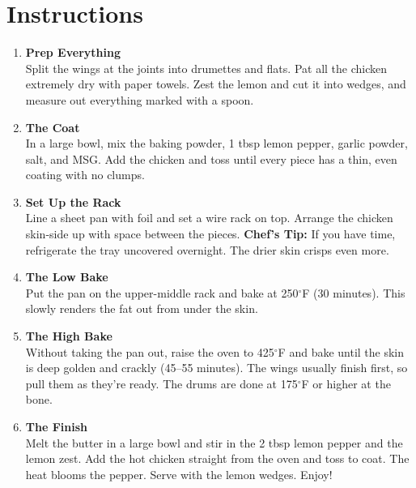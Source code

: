 \newpage
{}
\section*{Instructions}

\begin{enumerate}

      \item \textbf{Prep Everything} \\
            Split the wings at the joints into drumettes and flats. Pat all the chicken extremely dry with paper towels. Zest the lemon and cut it into wedges, and measure out everything marked with a spoon.

      \item \textbf{The Coat} \\
            In a large bowl, mix the baking powder, 1 tbsp lemon pepper, garlic powder, salt, and MSG. Add the chicken and toss until every piece has a thin, even coating with no clumps.

      \item \textbf{Set Up the Rack} \\
            Line a sheet pan with foil and set a wire rack on top. Arrange the chicken skin-side up with space between the pieces. \textbf{Chef's Tip:} If you have time, refrigerate the tray uncovered overnight. The drier skin crisps even more.

      \item \textbf{The Low Bake} \\
            Put the pan on the upper-middle rack and bake at 250$^\circ$F (30 minutes). This slowly renders the fat out from under the skin.

      \item \textbf{The High Bake} \\
            Without taking the pan out, raise the oven to 425$^\circ$F and bake until the skin is deep golden and crackly (45--55 minutes). The wings usually finish first, so pull them as they're ready. The drums are done at 175$^\circ$F or higher at the bone.

      \item \textbf{The Finish} \\
            Melt the butter in a large bowl and stir in the 2 tbsp lemon pepper and the lemon zest. Add the hot chicken straight from the oven and toss to coat. The heat blooms the pepper. Serve with the lemon wedges. Enjoy!

\end{enumerate}


